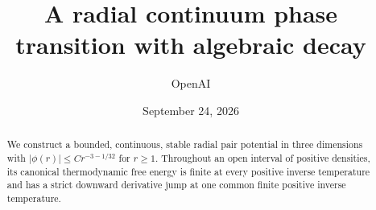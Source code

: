 \documentclass[11pt]{article}
\title{A radial continuum phase transition with algebraic decay}
\author{OpenAI}
\date{September 24, 2026}
\theoremstyle{definition}
\theoremstyle{remark}
\numberwithin{equation}{section}
\begin{document}
\maketitle
\begin{abstract}
We construct a bounded, continuous, stable radial pair potential in three
dimensions with \(|\phi(r)|\le Cr^{-3-1/32}\) for \(r\ge1\). Throughout an
open interval of positive densities, its canonical thermodynamic free energy
is finite at every positive inverse temperature and has a strict downward
derivative jump at one common finite positive inverse temperature.
\end{abstract}








\begingroup
\raggedright

\endgroup
\end{document}
